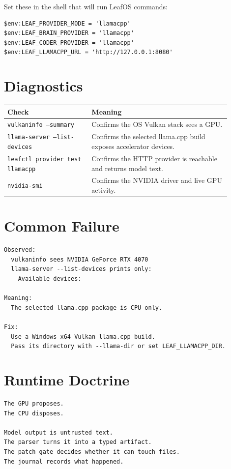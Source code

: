 \documentclass[11pt]{article}
\newcommand{\code}[1]{\texttt{#1}}
\begin{document}
Set these in the shell that will run LeafOS commands:

\begin{Verbatim}[fontsize=\small, frame=single]
$env:LEAF_PROVIDER_MODE = 'llamacpp'
$env:LEAF_BRAIN_PROVIDER = 'llamacpp'
$env:LEAF_CODER_PROVIDER = 'llamacpp'
$env:LEAF_LLAMACPP_URL = 'http://127.0.0.1:8080'
\end{Verbatim}

\section*{Diagnostics}

\begin{longtable}{@{}p{0.34\linewidth}p{0.56\linewidth}@{}}
\toprule
Check & Meaning \\
\midrule
\code{vulkaninfo --summary} & Confirms the OS Vulkan stack sees a GPU. \\
\code{llama-server --list-devices} & Confirms the selected llama.cpp build exposes accelerator devices. \\
\code{leafctl provider test llamacpp} & Confirms the HTTP provider is reachable and returns model text. \\
\code{nvidia-smi} & Confirms the NVIDIA driver and live GPU activity. \\
\bottomrule
\end{longtable}

\section*{Common Failure}

\begin{Verbatim}[fontsize=\small, frame=single]
Observed:
  vulkaninfo sees NVIDIA GeForce RTX 4070
  llama-server --list-devices prints only:
    Available devices:

Meaning:
  The selected llama.cpp package is CPU-only.

Fix:
  Use a Windows x64 Vulkan llama.cpp build.
  Pass its directory with --llama-dir or set LEAF_LLAMACPP_DIR.
\end{Verbatim}

\section*{Runtime Doctrine}

\begin{Verbatim}[fontsize=\small, frame=single]
The GPU proposes.
The CPU disposes.

Model output is untrusted text.
The parser turns it into a typed artifact.
The patch gate decides whether it can touch files.
The journal records what happened.
\end{Verbatim}
\end{document}
